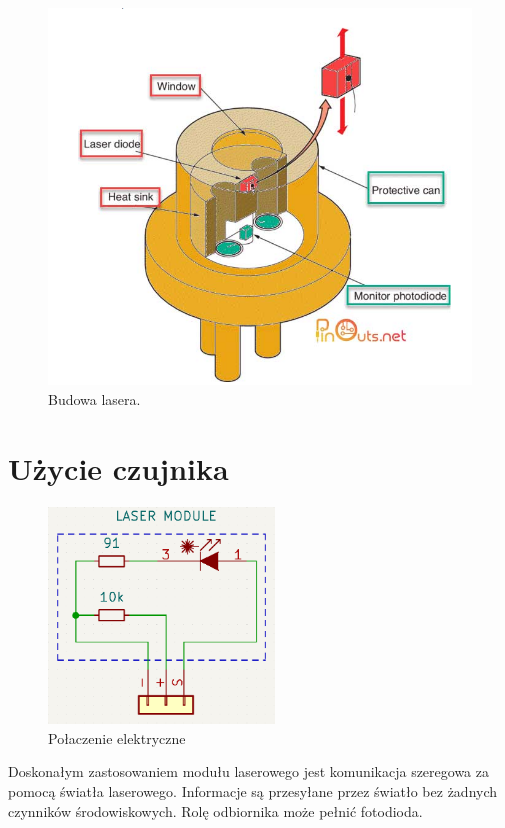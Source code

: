 \documentclass[11pt, a4paper]{article}
\begin{document}
\vspace{0.5cm}
\begin{figure}[h]
\centering
\includegraphics[width=.75\linewidth]{fig/laser/budowa.png}
\caption{Budowa lasera.\cite{budowa}}
\label{fig:test}
\end{figure}
\vspace{0.5cm}

\newpage
\section{Użycie czujnika}

\vspace{0.5cm}
\begin{figure}[h!]
    \centering
    \includegraphics[width=6cm]{fig/laser/kicadLaser.png}
    \caption{Połaczenie elektryczne}
    \label{fig:my_label}
\end{figure}
\vspace{0.5cm}

Doskonałym zastosowaniem modułu laserowego jest komunikacja szeregowa za pomocą światła laserowego. Informacje są przesyłane przez światło bez żadnych czynników środowiskowych. Rolę odbiornika może pełnić fotodioda.
\end{document}
